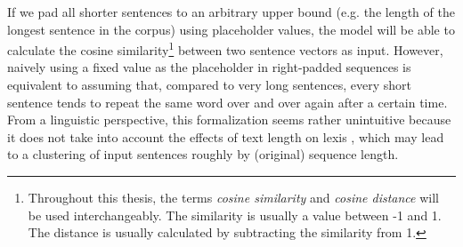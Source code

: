 If we pad all shorter sentences to an arbitrary upper bound (e.g. the length of the longest sentence in the corpus) using placeholder values, the model will be able to calculate the cosine similarity\footnote{Throughout this thesis, the terms \textit{cosine similarity} and \textit{cosine distance} will be used interchangeably. The similarity is usually a value between -1 and 1. The distance is usually calculated by subtracting the similarity from 1.} \parencite[3]{luoCosineNormalizationUsing2017} between two sentence vectors as input. However, naively using a fixed value as the placeholder in right-padded sequences \parencite[386]{sachanEffectiveUseBidirectional2018} is equivalent to assuming that, compared to very long sentences, every short sentence tends to repeat the same word over and over again after a certain time. From a linguistic perspective, this formalization seems rather unintuitive because it does not take into account the effects of text length on lexis \parencites[31]{golcherStylometryInterplayTopic2011}[141]{ochabStylometryLiteraryPapyri2019}, which may lead to a clustering of input sentences roughly by (original) sequence length.

